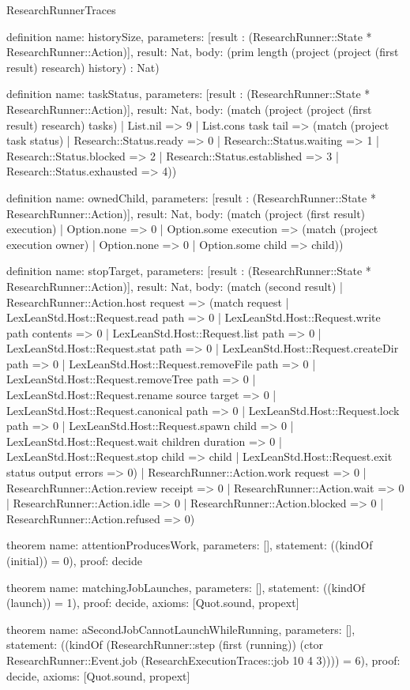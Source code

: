 \begin{lexlean}{ResearchRunnerTraces}
\begin{semanticmodule}
definition{
  name: historySize,
  parameters: [result : (ResearchRunner::State * ResearchRunner::Action)],
  result: Nat,
  body: (prim length (project (project (first result) research) history) : Nat)
}

definition{
  name: taskStatus,
  parameters: [result : (ResearchRunner::State * ResearchRunner::Action)],
  result: Nat,
  body: (match (project (project (first result) research) tasks) | List.nil => 9 | List.cons task tail => (match (project task status) | Research::Status.ready => 0 | Research::Status.waiting => 1 | Research::Status.blocked => 2 | Research::Status.established => 3 | Research::Status.exhausted => 4))
}

definition{
  name: ownedChild,
  parameters: [result : (ResearchRunner::State * ResearchRunner::Action)],
  result: Nat,
  body: (match (project (first result) execution) | Option.none => 0 | Option.some execution => (match (project execution owner) | Option.none => 0 | Option.some child => child))
}

definition{
  name: stopTarget,
  parameters: [result : (ResearchRunner::State * ResearchRunner::Action)],
  result: Nat,
  body: (match (second result) | ResearchRunner::Action.host request => (match request | LexLeanStd.Host::Request.read path => 0 | LexLeanStd.Host::Request.write path contents => 0 | LexLeanStd.Host::Request.list path => 0 | LexLeanStd.Host::Request.stat path => 0 | LexLeanStd.Host::Request.createDir path => 0 | LexLeanStd.Host::Request.removeFile path => 0 | LexLeanStd.Host::Request.removeTree path => 0 | LexLeanStd.Host::Request.rename source target => 0 | LexLeanStd.Host::Request.canonical path => 0 | LexLeanStd.Host::Request.lock path => 0 | LexLeanStd.Host::Request.spawn child => 0 | LexLeanStd.Host::Request.wait children duration => 0 | LexLeanStd.Host::Request.stop child => child | LexLeanStd.Host::Request.exit status output errors => 0) | ResearchRunner::Action.work request => 0 | ResearchRunner::Action.review receipt => 0 | ResearchRunner::Action.wait => 0 | ResearchRunner::Action.idle => 0 | ResearchRunner::Action.blocked => 0 | ResearchRunner::Action.refused => 0)
}

theorem{
  name: attentionProducesWork,
  parameters: [],
  statement: ((kindOf (initial)) = 0),
  proof: decide{}
}

theorem{
  name: matchingJobLaunches,
  parameters: [],
  statement: ((kindOf (launch)) = 1),
  proof: decide{},
  axioms: [Quot.sound, propext]
}

theorem{
  name: aSecondJobCannotLaunchWhileRunning,
  parameters: [],
  statement: ((kindOf (ResearchRunner::step (first (running)) (ctor ResearchRunner::Event.job (ResearchExecutionTraces::job 10 4 3)))) = 6),
  proof: decide{},
  axioms: [Quot.sound, propext]
}


\end{semanticmodule}
\end{lexlean}
